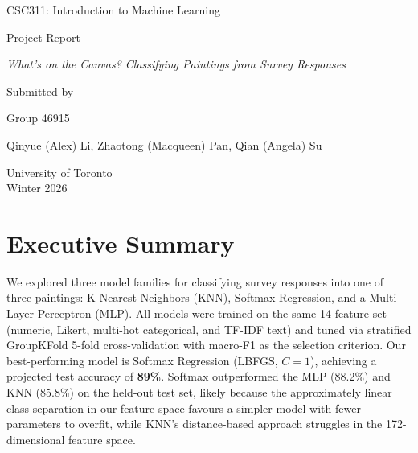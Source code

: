 \documentclass[12pt]{article}
\begin{document}
\begin{titlepage}
    \centering
    \vspace*{3cm}

    {\Large {CSC311: Introduction to Machine Learning} \par}
    \vspace{1cm}
    
    {\Large {Project Report} \par}
    \vspace{1cm}
    
    {\large \textit{What's on the Canvas? Classifying Paintings from Survey Responses} \par}
    \vspace{3cm}
    
    {\large Submitted by \par}
    
    \vspace{0.5cm}
    {\large Group 46915}
    
    \vspace{0.5cm}
    {\large Qinyue (Alex) Li, Zhaotong (Macqueen) Pan, Qian (Angela) Su \par}
    
    \vfill
    {\large University of Toronto \\ Winter 2026 \par}
\end{titlepage}
\clearpage
\setcounter{page}{1}

\section{Executive Summary}

We explored three model families for classifying survey responses into one of three paintings: K-Nearest Neighbors (KNN), Softmax Regression, and a Multi-Layer Perceptron (MLP). All models were trained on the same 14-feature set (numeric, Likert, multi-hot categorical, and TF-IDF text) and tuned via stratified GroupKFold 5-fold cross-validation with macro-F1 as the selection criterion. Our best-performing model is Softmax Regression (LBFGS, $C{=}1$), achieving a projected test accuracy of \textbf{89\%}. Softmax outperformed the MLP (88.2\%) and KNN (85.8\%) on the held-out test set, likely because the approximately linear class separation in our feature space favours a simpler model with fewer parameters to overfit, while KNN's distance-based approach struggles in the 172-dimensional feature space.
\end{document}
